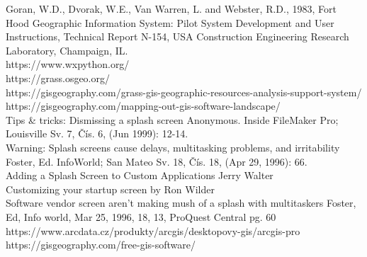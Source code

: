 \documentclass[a4paper,10pt,twoside]{article}
\begin{document}
Goran, W.D., Dvorak, W.E., Van Warren, L. and Webster, R.D., 1983, Fort Hood Geographic Information System: Pilot System Development and User Instructions, Technical Report N-154, USA Construction Engineering Research Laboratory, Champaign, IL.\\

https://www.wxpython.org/\\

https://grass.osgeo.org/\\

https://gisgeography.com/grass-gis-geographic-resources-analysis-support-system/\\

https://gisgeography.com/mapping-out-gis-software-landscape/\\

Tips \& tricks: Dismissing a splash screen Anonymous. Inside FileMaker Pro; Louisville Sv. 7, Čís. 6,  (Jun 1999): 12-14. \\

Warning: Splash screens cause delays, multitasking problems, and irritability Foster, Ed. InfoWorld; San Mateo Sv. 18, Čís. 18,  (Apr 29, 1996): 66. \\

Adding a Splash Screen to Custom Applications Jerry Walter \\

Customizing your startup screen by Ron Wilder \\

Software vendor screen aren't making mush of a splash with multitaskers Foster, Ed, Info world, Mar 25, 1996, 18, 13, ProQuest Central pg. 60 \\

https://www.arcdata.cz/produkty/arcgis/desktopovy-gis/arcgis-pro \\







https://gisgeography.com/free-gis-software/\\
\end{document}
